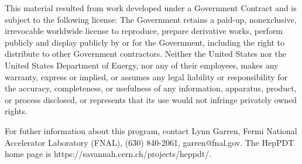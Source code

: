 This material resulted from work developed under a Government Contract
and is subject to the following license:  The Government retains a
paid-up, nonexclusive, irrevocable worldwide license to reproduce,
prepare derivative works, perform publicly and display publicly by or for
the Government,  including the right to distribute to other Government
contractors.  Neither the United States nor the United States Department
of Energy, nor any of their employees, makes any warranty, express or
implied, or assumes any legal liability or responsibility for the
accuracy, completeness, or usefulness of any  information, apparatus,
product, or process disclosed, or represents that its use would not
infringe privately owned rights.
 
For futher information about this program, contact Lynn Garren,
Fermi National Accelerator Laboratory (FNAL), (630) 840-2061,
garren@fnal.gov.  The HepPDT home page is 
https://savannah.cern.ch/projects/heppdt/.

\newpage

\setcounter{page}{1}
\tableofcontents

\cleardoublepage
